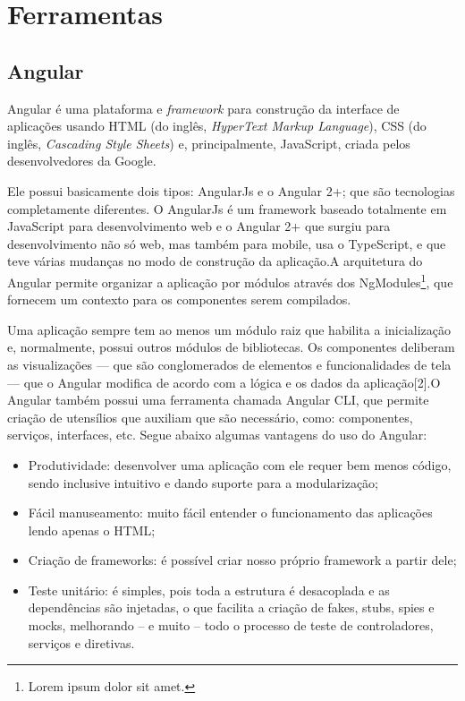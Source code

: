\section{Ferramentas}

\subsection{Angular}
Angular \cite{afonso2018angular} é uma plataforma e \textit{framework} para construção da interface de aplicações usando HTML (do inglês, \textit{HyperText Markup Language}), CSS (do inglês, \textit{Cascading Style Sheets}) e, principalmente, JavaScript, criada pelos desenvolvedores da Google. 

Ele possui basicamente dois tipos: AngularJs e o Angular 2+; que são tecnologias completamente diferentes. O AngularJs é um framework baseado totalmente em JavaScript para desenvolvimento web e o Angular 2+ que surgiu para desenvolvimento não só web, mas também para mobile, usa o TypeScript, e que teve várias mudanças no modo de construção da aplicação.A arquitetura do Angular permite organizar a aplicação por módulos através dos NgModules\footnote{Lorem ipsum dolor sit amet.}, que fornecem um contexto para os componentes serem compilados. 

Uma aplicação sempre tem ao menos um módulo raiz que habilita a inicialização e, normalmente, possui outros módulos de bibliotecas. Os componentes deliberam as visualizações — que são conglomerados de elementos e funcionalidades de tela — que o Angular modifica de acordo com a lógica e os dados da aplicação[2].O Angular também possui uma ferramenta chamada Angular CLI, que permite criação de utensílios que auxiliam que são necessário, como: componentes, serviços, interfaces, etc. Segue abaixo algumas vantagens do uso do Angular:  

\begin{itemize}
    \item Produtividade: desenvolver uma aplicação com ele requer bem menos código, sendo inclusive intuitivo e dando suporte para a modularização; 
    \item Fácil manuseamento: muito fácil entender o funcionamento das aplicações lendo apenas o HTML;   
    \item Criação de frameworks: é possível criar nosso próprio framework a partir dele;   
    \item Teste unitário: é simples, pois toda a estrutura é desacoplada e as dependências são injetadas, o que facilita a criação de fakes, stubs, spies e mocks, melhorando – e muito – todo o processo de teste de controladores, serviços e diretivas. 
\end{itemize}

